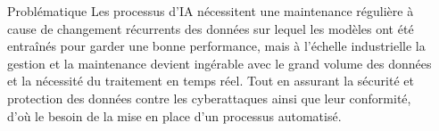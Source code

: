 \documentclass{ENSEIRB_poster}
\begin{document}
\begin{frame}[t]
\begin{columns}[t]
\begin{column}{\twocolwidth}
    \end{column}

    \begin{column}{\sepwidth}\end{column}
  \end{columns}


  \begin{columns}[c] 
    \begin{column}{\sepwidth}\end{column} %
  \end{columns}



  \begin{columns}[c] 
    \begin{column}{\sepwidth}\end{column} %

    \begin{column}{\onecolwidth}
      \begin{block}{Problématique}
        Les processus d'IA nécessitent une maintenance régulière à cause de changement récurrents des données sur lequel les modèles ont été entraînés pour garder une bonne performance, mais à l'échelle industrielle la gestion et la maintenance devient ingérable avec le grand volume des données et la nécessité du traitement en temps réel. Tout en assurant la sécurité et protection des données contre les cyberattaques ainsi que leur conformité, d'où le besoin de la mise en place d'un processus automatisé.


\end{block}
\end{column}
\end{columns}
\end{frame}
\end{document}
